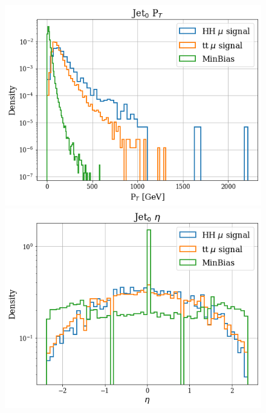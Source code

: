 \documentclass[../main.tex]{subfiles}
\begin{document}
\begin{figure}[!ht]
  \begin{minipage}[b]{0.33\linewidth}
    \centering
    \includegraphics[width=1\linewidth]{Chapters/Plots/Hist_1mu_jet0_Et.png}
  \end{minipage}%
  \begin{minipage}[b]{0.33\linewidth}
    \centering
    \includegraphics[width=1\linewidth]{Chapters/Plots/Hist_1mu_jet0_Eta.png}
  \end{minipage} %
  \begin{minipage}[b]{0.33\linewidth}

\end{minipage}
\end{figure}
\end{document}
